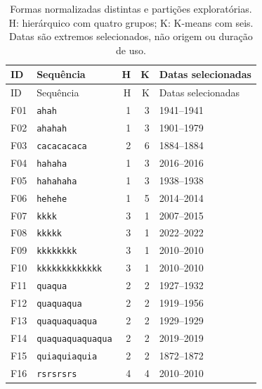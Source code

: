 \small\begin{longtable}{lp{}rrl}
\caption{Formas normalizadas distintas e partições exploratórias. H: hierárquico com quatro grupos; K: K-means com seis. Datas são extremos selecionados, não origem ou duração de uso.}\label{tab:form-clusters}\\
\toprule ID & Sequência & H & K & Datas selecionadas \\ \midrule\endfirsthead
\toprule ID & Sequência & H & K & Datas selecionadas \\ \midrule\endhead
F01 & \texttt{ahah} & 1 & 3 & 1941--1941 \\
F02 & \texttt{ahahah} & 1 & 3 & 1901--1979 \\
F03 & \texttt{cacacacaca} & 2 & 6 & 1884--1884 \\
F04 & \texttt{hahaha} & 1 & 3 & 2016--2016 \\
F05 & \texttt{hahahaha} & 1 & 3 & 1938--1938 \\
F06 & \texttt{hehehe} & 1 & 5 & 2014--2014 \\
F07 & \texttt{kkkk} & 3 & 1 & 2007--2015 \\
F08 & \texttt{kkkkk} & 3 & 1 & 2022--2022 \\
F09 & \texttt{kkkkkkkk} & 3 & 1 & 2010--2010 \\
F10 & \texttt{kkkkkkkkkkkkk} & 3 & 1 & 2010--2010 \\
F11 & \texttt{quaqua} & 2 & 2 & 1927--1932 \\
F12 & \texttt{quaquaqua} & 2 & 2 & 1919--1956 \\
F13 & \texttt{quaquaquaqua} & 2 & 2 & 1929--1929 \\
F14 & \texttt{quaquaquaquaqua} & 2 & 2 & 2019--2019 \\
F15 & \texttt{quiaquiaquia} & 2 & 2 & 1872--1872 \\
F16 & \texttt{rsrsrsrs} & 4 & 4 & 2010--2010 \\
\bottomrule\end{longtable}\normalsize
